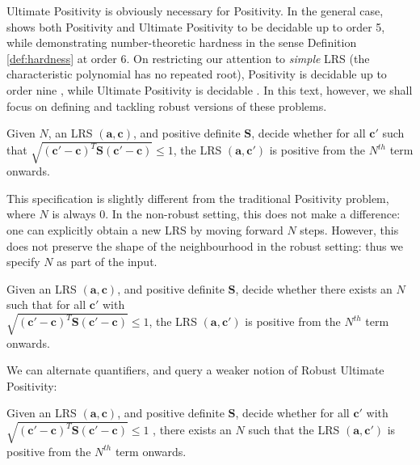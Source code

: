 Ultimate Positivity is obviously necessary for Positivity. In the general case, \cite{joeljames3} shows both Positivity and Ultimate Positivity to be decidable up to order 5, while demonstrating number-theoretic hardness in the sense Definition \ref{def:hardness} at order $6$. On restricting our attention to \textit{simple} LRS (the characteristic polynomial has no repeated root), Positivity is decidable up to order nine \cite{ouaknine2014positivity}, while Ultimate Positivity is decidable \cite{ouaknine2014ultimate}. In this text, however, we shall focus on defining and tackling robust versions of these problems.

\begin{problem}
\label{prob:rrobpos}
Given $N$, an LRS $(\mathbf{a}, \mathbf{c})$, and positive definite $\mathbf{S}$, decide whether for all $\mathbf{c'}$ such that $\sqrt{(\mathbf{c'} - \mathbf{c})^T\mathbf{S}(\mathbf{c'} - \mathbf{c})} \le 1$, the LRS $(\mathbf{a}, \mathbf{c'})$ is positive from the $N^{th}$ term onwards.
\end{problem}

This specification is slightly different from the traditional Positivity problem, where $N$ is always $0$. In the non-robust setting, this does not make a difference: one can explicitly obtain a new LRS by moving forward $N$ steps. However, this does not preserve the shape of the neighbourhood in the robust setting: thus we specify $N$ as part of the input.

\begin{problem}
\label{prob:rrobuniultpos}
Given an LRS $(\mathbf{a}, \mathbf{c})$, and positive definite $\mathbf{S}$, decide whether there exists an $N$ such that for all $\mathbf{c'}$ with\\ $\sqrt{(\mathbf{c'} - \mathbf{c})^T\mathbf{S}(\mathbf{c'} - \mathbf{c})} \le 1$, the LRS $(\mathbf{a}, \mathbf{c'})$ is positive from the $N^{th}$ term onwards.
\end{problem}

We can alternate quantifiers, and query a weaker notion of Robust Ultimate Positivity:
\begin{problem}
\label{prob:rrobnonuniultpos}
Given an LRS $(\mathbf{a}, \mathbf{c})$, and positive definite $\mathbf{S}$, decide whether for all $\mathbf{c'}$ with $\sqrt{(\mathbf{c'} - \mathbf{c})^T\mathbf{S}(\mathbf{c'} - \mathbf{c})} \le 1$ , there exists an $N$ such that the LRS $(\mathbf{a}, \mathbf{c'})$ is positive from the $N^{th}$ term onwards.
\end{problem}

